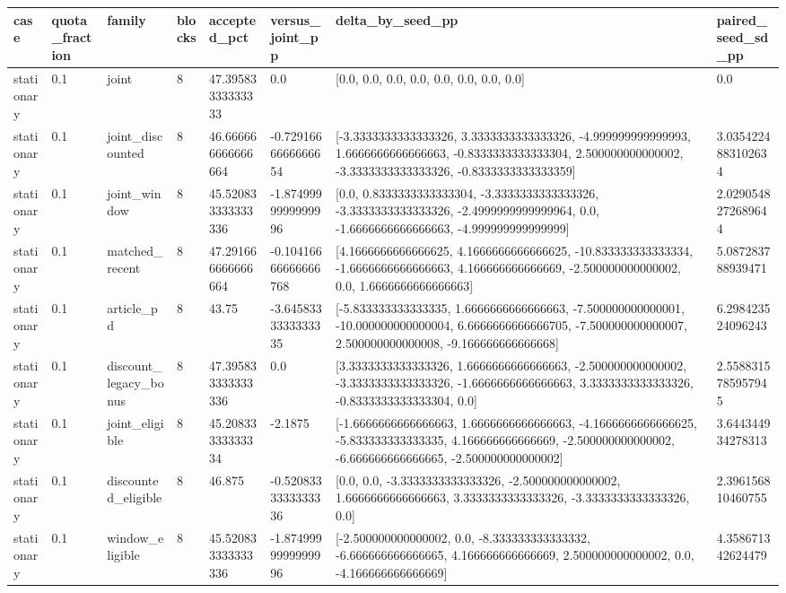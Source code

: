 \begin{tabular}{llllllll}
case & quota\_fraction & family & blocks & accepted\_pct & versus\_joint\_pp & delta\_by\_seed\_pp & paired\_seed\_sd\_pp \\
\hline
stationary & 0.1 & joint & 8 & 47.39583333333333 & 0.0 & [0.0, 0.0, 0.0, 0.0, 0.0, 0.0, 0.0, 0.0] & 0.0 \\
stationary & 0.1 & joint\_discounted & 8 & 46.666666666666664 & -0.7291666666666654 & [-3.3333333333333326, 3.3333333333333326, -4.999999999999993, 1.6666666666666663, -0.8333333333333304, 2.500000000000002, -3.3333333333333326, -0.8333333333333359] & 3.0354224883102634 \\
stationary & 0.1 & joint\_window & 8 & 45.520833333333336 & -1.8749999999999996 & [0.0, 0.8333333333333304, -3.3333333333333326, -3.3333333333333326, -2.4999999999999964, 0.0, -1.6666666666666663, -4.999999999999999] & 2.0290548272689644 \\
stationary & 0.1 & matched\_recent & 8 & 47.291666666666664 & -0.10416666666666768 & [4.1666666666666625, 4.1666666666666625, -10.833333333333334, -1.6666666666666663, 4.166666666666669, -2.500000000000002, 0.0, 1.6666666666666663] & 5.087283788939471 \\
stationary & 0.1 & article\_pd & 8 & 43.75 & -3.6458333333333335 & [-5.833333333333335, 1.6666666666666663, -7.500000000000001, -10.000000000000004, 6.6666666666666705, -7.500000000000007, 2.500000000000008, -9.166666666666668] & 6.298423524096243 \\
stationary & 0.1 & discount\_legacy\_bonus & 8 & 47.395833333333336 & 0.0 & [3.3333333333333326, 1.6666666666666663, -2.500000000000002, -3.3333333333333326, -1.6666666666666663, 3.3333333333333326, -0.8333333333333304, 0.0] & 2.5588315785957945 \\
stationary & 0.1 & joint\_eligible & 8 & 45.20833333333334 & -2.1875 & [-1.6666666666666663, 1.6666666666666663, -4.1666666666666625, -5.833333333333335, 4.166666666666669, -2.500000000000002, -6.666666666666665, -2.500000000000002] & 3.644344934278313 \\
stationary & 0.1 & discounted\_eligible & 8 & 46.875 & -0.5208333333333336 & [0.0, 0.0, -3.3333333333333326, -2.500000000000002, 1.6666666666666663, 3.3333333333333326, -3.3333333333333326, 0.0] & 2.396156810460755 \\
stationary & 0.1 & window\_eligible & 8 & 45.520833333333336 & -1.8749999999999996 & [-2.500000000000002, 0.0, -8.333333333333332, -6.666666666666665, 4.166666666666669, 2.500000000000002, 0.0, -4.166666666666669] & 4.358671342624479 \\

\end{tabular}
